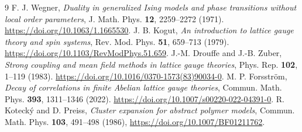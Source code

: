 \documentclass[11pt,a4paper]{article}
\begin{document}
\begin{thebibliography}{9}
 F. J. Wegner, \emph{Duality in generalized Ising models and phase transitions without local order parameters}, J. Math. Phys. \textbf{12}, 2259--2272 (1971). \url{https://doi.org/10.1063/1.1665530}.
 J. B. Kogut, \emph{An introduction to lattice gauge theory and spin systems}, Rev. Mod. Phys. \textbf{51}, 659--713 (1979). \url{https://doi.org/10.1103/RevModPhys.51.659}.
 J.-M. Drouffe and J.-B. Zuber, \emph{Strong coupling and mean field methods in lattice gauge theories}, Phys. Rep. \textbf{102}, 1--119 (1983). \url{https://doi.org/10.1016/0370-1573(83)90034-0}.
 M. P. Forsstr\"om, \emph{Decay of correlations in finite Abelian lattice gauge theories}, Commun. Math. Phys. \textbf{393}, 1311--1346 (2022). \url{https://doi.org/10.1007/s00220-022-04391-0}.
 R. Koteck\'y and D. Preiss, \emph{Cluster expansion for abstract polymer models}, Commun. Math. Phys. \textbf{103}, 491--498 (1986), \url{https://doi.org/10.1007/BF01211762}.
\end{thebibliography}
\end{document}
